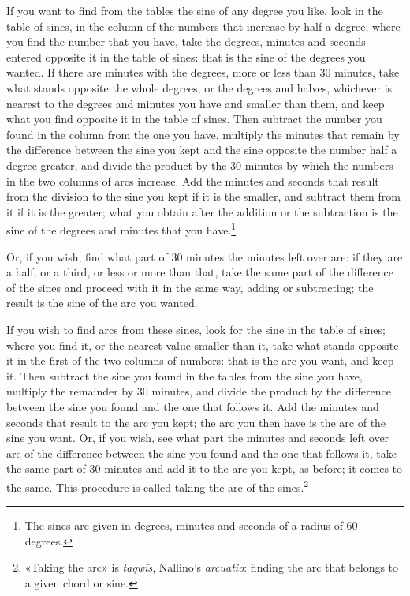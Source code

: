 \documentclass[11pt]{article}
\newcommand{\ArPage}[1]{\marginpar{\footnotesize\color{gray}Ar.\,p.\,#1}}
\begin{document}
\par \ArPage{16}If you want to find from the tables the sine of any degree you like, look in the table of sines, in the column of the numbers that increase by half a degree; where you find the number that you have, take the degrees, minutes and seconds entered opposite it in the table of sines: that is the sine of the degrees you wanted. If there are minutes with the degrees, more or less than 30 minutes, take what stands opposite the whole degrees, or the degrees and halves, whichever is nearest to the degrees and minutes you have and smaller than them, and keep what you find opposite it in the table of sines. Then subtract the number you found in the column from the one you have, multiply the minutes that remain by the difference between the sine you kept and the sine opposite the number half a degree greater, and divide the product by the 30 minutes by which the numbers in the two columns of arcs increase. Add the minutes and seconds that result from the division to the sine you kept if it is the smaller, and subtract them from it if it is the greater; what you obtain after the addition or the subtraction is the sine of the degrees and minutes that you have.\footnote{The sines are given in degrees, minutes and seconds of a radius of 60 degrees.}\par
\par Or, if you wish, find what part of 30 minutes the minutes left over are: if they are a half, or a third, or less or more than that, take the same part of the difference of the sines and proceed with it in the same way, adding or subtracting; the result is the sine of the arc you wanted.\par
\par If you wish to find arcs from these sines, look for the sine in the table of sines; where you find it, or the nearest value smaller than it, take what stands opposite it in the first of the two columns of numbers: that is the arc you want, and keep it. Then subtract the sine you found in the tables from the sine you have, multiply the remainder by 30 minutes, and divide the product by the difference between the sine you found and the one that follows it. Add the minutes and seconds that result to the arc you kept; the arc you then have is the arc of the sine you want. Or, if you wish, see what part the minutes and seconds left over are of the difference between the sine you found and the one that follows it, take the same part of 30 minutes and add it to the arc you kept, as before; it comes to the same. This procedure is called taking the arc of the sines.\footnote{«Taking the arc» is \emph{taqwīs}, Nallino's \emph{arcuatio}: finding the arc that belongs to a given chord or sine.}\par
\end{document}
